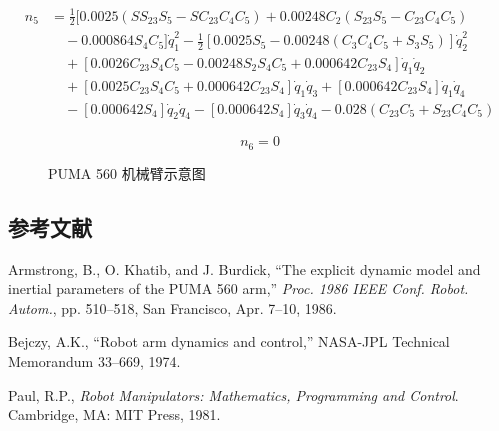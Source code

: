 \documentclass[UTF8]{ctexart}
\begin{document}
\begin{align*}
n_5 &= \frac{1}{2}[0.0025(SS_{23}S_5 - SC_{23}C_4C_5) + 0.00248C_2(S_{23}S_5 - C_{23}C_4C_5) \\
&\quad - 0.000864S_4C_5]\dot{q}_1^2 - \frac{1}{2}[0.0025S_5 - 0.00248(C_3C_4C_5 + S_3S_5)]\dot{q}_2^2 \\
&\quad + [0.0026C_{23}S_4C_5 - 0.00248S_2S_4C_5 + 0.000642C_{23}S_4]\dot{q}_1\dot{q}_2 \\
&\quad + [0.0025C_{23}S_4C_5 + 0.000642C_{23}S_4]\dot{q}_1\dot{q}_3 + [0.000642C_{23}S_4]\dot{q}_1\dot{q}_4 \\
&\quad - [0.000642S_4]\dot{q}_2\dot{q}_4 - [0.000642S_4]\dot{q}_3\dot{q}_4 - 0.028(C_{23}C_5 + S_{23}C_4C_5)
\end{align*}

\begin{equation*}
n_6 = 0
\end{equation*}

\begin{figure}[H]
\centering
{}
\caption{PUMA 560 机械臂示意图}
\end{figure}

\vspace{1em}

\subsection*{参考文献}

\noindent [Armstrong et al. 1986] Armstrong, B., O. Khatib, and J. Burdick, ``The explicit dynamic model and inertial parameters of the PUMA 560 arm,'' \textit{Proc. 1986 IEEE Conf. Robot. Autom.}, pp. 510--518, San Francisco, Apr. 7--10, 1986.

\vspace{0.5em}

\noindent [Bejczy 1974] Bejczy, A.K., ``Robot arm dynamics and control,'' NASA-JPL Technical Memorandum 33--669, 1974.

\vspace{0.5em}

\noindent [Paul 1981] Paul, R.P., \textit{Robot Manipulators: Mathematics, Programming and Control}. Cambridge, MA: MIT Press, 1981.

\ifstandalone
  
\end{document}
